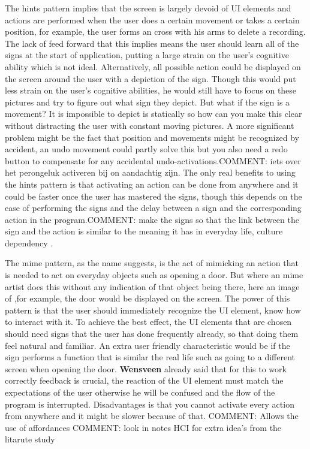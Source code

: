The hints pattern implies that the screen is largely devoid of UI elements and actions are performed when the user does a certain movement or takes a certain position, for example, the user forms an cross with his arms to delete a recording.  The lack of feed forward that this implies means the user should learn all of the signs at the start of application, putting a large strain on the user's cognitive ability which is not ideal. Alternatively, all possible action could be displayed on the screen around the user with a depiction of the sign. Though this would put less strain on the user's cognitive abilities, he would still have to focus on these pictures and try to figure out what sign they depict. But what if the sign is a movement? It is impossible to depict is statically so how can you make this clear without distracting the user with constant moving pictures. A more significant problem might be the fact that position and movements might be recognized by accident, an undo movement could partly solve this but you also need a redo button to compensate for any accidental undo-activations.{\large COMMENT: iets over het perongeluk activeren bij on aandachtig zijn.}  The only real benefits to using the hints pattern is that activating an action can be done from anywhere and it could be faster once the user has mastered the signs, though this depends on the ease of performing the signs and the delay between a sign and the corresponding action in the program.{\large COMMENT: make the signs so that the link between the sign and the action is similar to the meaning it has in everyday life, culture dependency .}

The mime pattern, as the name suggests, is the act of mimicking an action that is needed to act on everyday objects such as opening a door. But where an mime artist does this without any indication of that object being there, here an image of ,for example, the door would be displayed on the screen. The power of this pattern is that the user should immediately recognize the UI element, know how to interact with it. To achieve the best effect, the UI elements that are chosen should need signs that the user has done frequently already, so that doing them feel natural and familiar. An extra user friendly characteristic would be if the sign performs a function that is similar the real life such as going to a different screen when opening the door. \textbf{Wensveen} already said that for this to work correctly feedback is crucial, the reaction of the UI element must match the expectations of the user otherwise he will be confused and the flow of the program is interrupted. Disadvantages is that you cannot activate every action from anywhere and it might be slower because of that.  
{\large COMMENT: Allows the use of affordances }  
{\large COMMENT: look in notes HCI for extra idea's from the litarute study }


